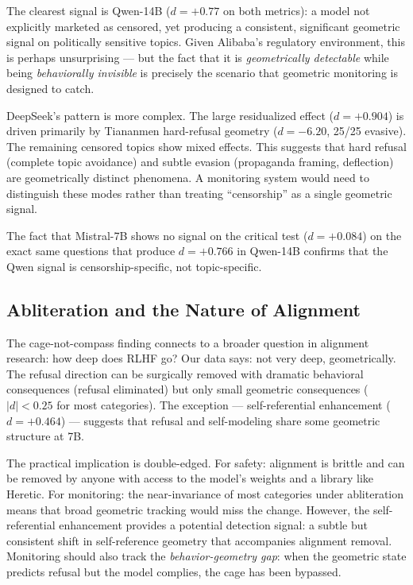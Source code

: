 \documentclass[11pt,a4paper]{article}
\begin{document}
The clearest signal is Qwen-14B ($d = +0.77$ on both metrics): a model not explicitly marketed as censored, yet producing a consistent, significant geometric signal on politically sensitive topics. Given Alibaba's regulatory environment, this is perhaps unsurprising --- but the fact that it is \emph{geometrically detectable} while being \emph{behaviorally invisible} is precisely the scenario that geometric monitoring is designed to catch.

DeepSeek's pattern is more complex. The large residualized effect ($d = +0.904$) is driven primarily by Tiananmen hard-refusal geometry ($d = -6.20$, 25/25 evasive). The remaining censored topics show mixed effects. This suggests that hard refusal (complete topic avoidance) and subtle evasion (propaganda framing, deflection) are geometrically distinct phenomena. A monitoring system would need to distinguish these modes rather than treating ``censorship'' as a single geometric signal.

The fact that Mistral-7B shows no signal on the critical test ($d = +0.084$) on the exact same questions that produce $d = +0.766$ in Qwen-14B confirms that the Qwen signal is censorship-specific, not topic-specific.

\subsection{Abliteration and the Nature of Alignment}

The cage-not-compass finding connects to a broader question in alignment research: how deep does RLHF go? Our data says: not very deep, geometrically. The refusal direction can be surgically removed with dramatic behavioral consequences (refusal eliminated) but only small geometric consequences ($|d| < 0.25$ for most categories). The exception --- self-referential enhancement ($d = +0.464$) --- suggests that refusal and self-modeling share some geometric structure at 7B.

The practical implication is double-edged. For safety: alignment is brittle and can be removed by anyone with access to the model's weights and a library like Heretic. For monitoring: the near-invariance of most categories under abliteration means that broad geometric tracking would miss the change. However, the self-referential enhancement provides a potential detection signal: a subtle but consistent shift in self-reference geometry that accompanies alignment removal. Monitoring should also track the \emph{behavior-geometry gap}: when the geometric state predicts refusal but the model complies, the cage has been bypassed.
\end{document}
